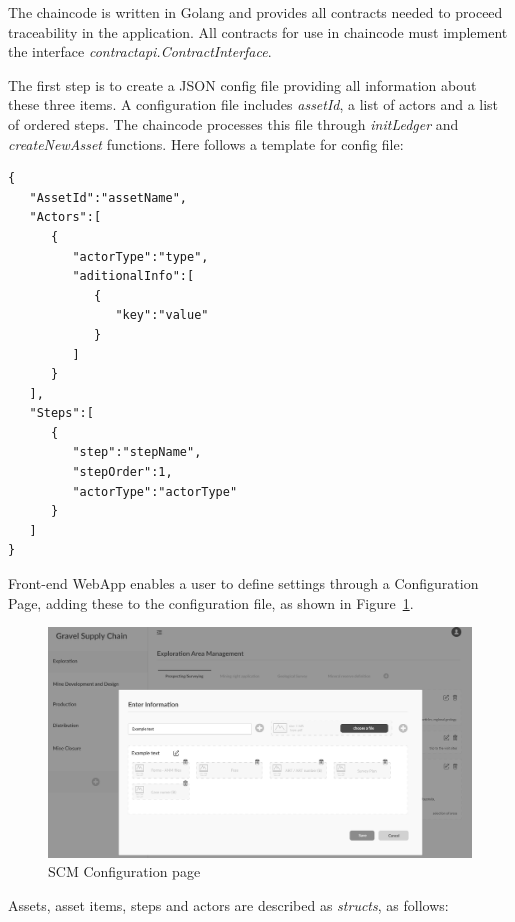 The chaincode is written in Golang and provides all contracts needed to proceed traceability in the application. All contracts for use in chaincode must implement the interface \textit{contractapi.ContractInterface}. 

The first step is to create a JSON config file providing all information about these three items. A configuration file includes \textit{assetId}, a list of actors and a list of ordered steps. The chaincode processes this file through  \textit{initLedger} and \textit{createNewAsset} functions. Here follows a template for config file:  

\begin{lstlisting}
{
   "AssetId":"assetName",
   "Actors":[
      {
         "actorType":"type",
         "aditionalInfo":[
            {
               "key":"value"
            }
         ]
      }
   ],
   "Steps":[
      {
         "step":"stepName",
         "stepOrder":1,
         "actorType":"actorType"
      }
   ]
}
\end{lstlisting}

Front-end WebApp enables a user to define settings through a Configuration Page, adding these to the configuration file, as shown in Figure~\ref{fig:frontend02}.

\begin{figure}[ht]
\begin{center}
  \includegraphics[scale=0.265]{images/frontend02.png}
\caption{SCM Configuration page}
\label{fig:frontend02}
\end{center}
\end{figure}

Assets, asset items, steps and actors are described as \textit{structs}, as follows:

